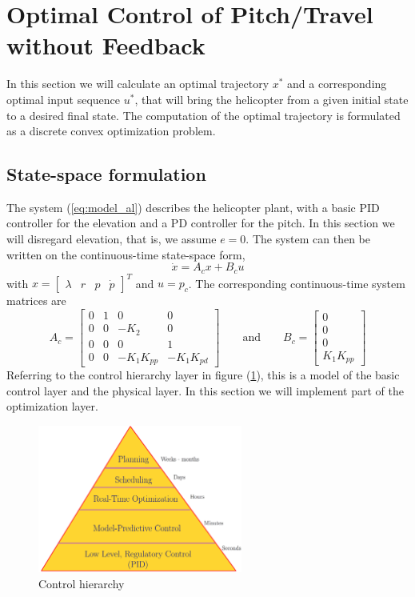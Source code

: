 \section{Optimal Control of Pitch/Travel without Feedback}\label{sec:prob2}

In this section we will calculate an optimal trajectory $x^*$ and a
corresponding optimal input sequence $u^*$, that will bring the helicopter
from a given initial state to a desired final state. The computation of the
optimal trajectory is formulated as a discrete convex optimization problem.

\subsection{State-space formulation}
The system (\ref{eq:model_al}) describes the helicopter plant, with a basic
PID controller for the elevation and a PD controller for the pitch. In this
section we will disregard elevation, that is, we assume $e = 0$. The system
can then be written on the continuous-time state-space form,
\begin{equation}
    \dot{x} = A_cx + B_cu
    \label{eq:state_space_axbu}
\end{equation}
with $x = \begin{bmatrix} \lambda & r & p & \dot{p} \end{bmatrix}^T$ and $u = p_c$.
The corresponding continuous-time system matrices are
\begin{equation}
	A_c = \begin{bmatrix} 0 & 1 & 0 & 0 \\ 0 & 0 & -K_2 & 0 \\ 0 & 0 & 0 & 1 \\ 0 & 0 & -K_1K_{pp} & -K_1K_{pd} \end{bmatrix}
	\qquad\text{and}\qquad
	B_c = \begin{bmatrix}0 \\ 0 \\ 0 \\K_1K_{pp} \end{bmatrix}
\end{equation}
Referring to the control hierarchy layer in figure (\ref{fig:control_hierarchy}),
this is a model of the basic control layer and the physical layer. In this section
we will implement part of the optimization layer.
\begin{figure}[ht]
	\centering
	\includegraphics[width=0.6\textwidth]{figures/control_hierarchy}
	\caption{Control hierarchy}
	\label{fig:control_hierarchy}
\end{figure}

